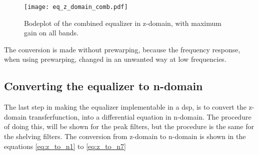\begin{figure}[!h]
    \centering
        \texttt{[image: eq\_z\_domain\_comb.pdf]}
        \caption{Bodeplot of the combined equalizer in z-domain, with maximum gain on all bands.}
        \label{fig:eq_z_domain_comb}
  \end{figure}

The conversion is made without prewarping, because the frequency response, when using prewarping, changed in an unwanted way at low frequencies.

\subsection{Converting the equalizer to n-domain}
The last step in making the equalizer implementable in a \gls{dsp}, is to convert the z-domain transferfunction, into a differential equation in n-domain. The procedure of doing this, will be shown for the peak filters, but the procedure is the same for the shelving filters. The conversion from z-domain to n-domain is shown in the equations \autoref{eq:z_to_n1} to \autoref{eq:z_to_n7} 

